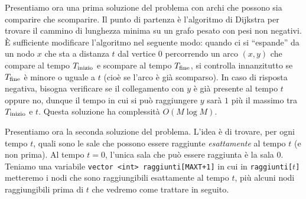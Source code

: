 \DijkstraModificato

Presentiamo ora una prima soluzione del problema con archi che possono sia comparire che scomparire. Il punto di partenza è l'algoritmo di Dijkstra per trovare il cammino di lunghezza minima su un grafo pesato con pesi non negativi. È sufficiente modificare l'algoritmo nel seguente modo: quando ci si ``espande'' da un nodo $x$ che sta a distanza $t$ dal vertice $0$ percorrendo un arco $(x, y)$ che compare al tempo $T_{\mathrm{inizio}}$ e scompare al tempo $T_{\mathrm{fine}}$, si controlla innanzitutto se $T_{\mathrm{fine}}$ è minore o uguale a $t$ (cioè se l'arco è già scomparso). In caso di risposta negativa, bisogna verificare se il collegamento con $y$ è già presente al tempo $t$ oppure no, dunque il tempo in cui si può raggiungere $y$ sarà $1$ più il massimo tra $T_{\mathrm{inizio}}$ e $t$. Questa soluzione ha complessità $O(M\log M)$.


\SoluzioneLineare

Presentiamo ora la seconda soluzione del problema. L'idea è di trovare, per ogni tempo $t$, quali sono le sale che possono essere raggiunte \emph{esattamente} al tempo $t$ (e non prima). Al tempo $t = 0$, l'unica sala che può essere raggiunta è la sala $0$. Teniamo una variabile \texttt{vector <int> raggiunti[MAXT+1]} in cui in \texttt{raggiunti[$t$]} metteremo i nodi che sono raggiungibili esattamente al tempo $t$, più alcuni nodi raggiungibili prima di $t$ che vedremo come trattare in seguito.

